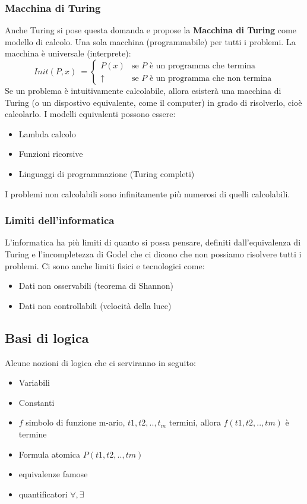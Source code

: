 \documentclass[a4paper]{article}
\begin{document}
\subsubsection{Macchina di Turing} 

Anche Turing si pose questa domanda e propose la \textbf{Macchina di Turing} come modello di calcolo.
Una sola macchina (programmabile) per tutti i problemi.
La macchina è universale (interprete):
\[Init(P,x)\ = \begin{cases}
    P(x) & \text{se } P \text{ è un programma che termina}\\
    \uparrow & \text{se } P \text{ è un programma che non termina}
\end{cases}\]
Se un problema è intuitivamente calcolabile, allora esisterà una macchina di Turing (o un dispostivo
equivalente, come il computer) in grado di risolverlo, cioè calcolarlo.
I modelli equivalenti possono essere:
\begin{itemize}
    \item Lambda calcolo 
    \item Funzioni ricorsive
    \item Linguaggi di programmazione (Turing completi)
\end{itemize}
I problemi non calcolabili sono infinitamente più numerosi di quelli calcolabili.
\subsubsection{Limiti dell'informatica}

L'informatica ha più limiti di quanto si possa pensare, definiti dall'equivalenza di Turing
e l'incompletezza di Godel che ci dicono che non possiamo risolvere tutti i problemi.
Ci sono anche limiti fisici e tecnologici come:
\begin{itemize}
    \item Dati non osservabili (teorema di Shannon)
    \item Dati non controllabili (velocità della luce)
\end{itemize}

\subsection{Basi di logica}

Alcune nozioni di logica che ci serviranno in seguito:
\begin{itemize}
    \item Variabili
    \item Constanti
    \item $f$ simbolo di funzione m-ario, $t1,t2,..,t_m$ termini, allora $f(t1,t2,..,tm)$ è termine 
    \item Formula atomica $P(t1,t2,..,tm)$
    \item equivalenze famose
    \item quantificatori $\forall, \exists$
\end{itemize}
\end{document}
